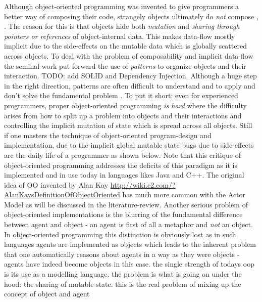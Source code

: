 Although object-oriented programming was invented to give programmers a better way of composing their code, strangely objects ultimately do \textit{not} compose \cite{bill_what_2017}, \cite{erkki_lindpere_why_2013}. The reason for this is that objects hide both \textit{mutation} and \textit{sharing through pointers or references} of object-internal data. This makes data-flow mostly implicit due to the side-effects on the mutable data which is globally scattered across objects. To deal with the problem of composability and implicit data-flow the seminal work \cite{gamma_design_1994} put forward the use of \textit{patterns} to organize objects and their interaction. TODO: add SOLID and Dependency Injection. Although a huge step in the right direction, patterns are often difficult to understand and to apply and don't solve the fundamental problem \cite{lawrence_krubner_object_2014}. To put it short: even for experienced programmers, proper object-oriented programming \textit{is hard} where the difficulty arises from how to split up a problem into objects and their interactions and controlling the implicit mutation of state which is spread across all objects. Still if one masters the technique of object-oriented program-design and implementation, due to the implicit global mutable state bugs due to side-effects are the daily life of a programmer as shown below. Note that this critique of object-oriented programming addresses the deficits of this paradigm as it is implemented and in use today in languages likes Java and C++. The original idea of OO invented by Alan Kay \url{http://wiki.c2.com/?AlanKaysDefinitionOfObjectOriented} has much more common with the Actor Model as will be discussed in the literature-review.
Another serious problem of object-oriented implementations is the blurring of the fundamental difference between agent and object - an agent is first of all a metaphor and \textit{not} an object. In object-oriented programming this distinction is obviously lost as in such languages agents are implemented as objects which leads to the inherent problem that one automatically reasons about agents in a way as they were objects - agents have indeed become objects in this case. the single strength of todays oop is its use as a modelling language. the problem is what is going on under the hood: the sharing of mutable state. this is the real problem of mixing up the concept of object and agent

